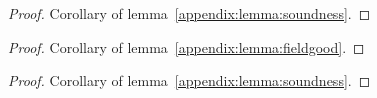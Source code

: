 \begin{lemma} \label{appendix:lemma:fieldgood}

\begin{proof}
  Corollary of lemma~\ref{appendix:lemma:soundness}.
\end{proof}

\end{lemma}

\begin{theorem} \label{appendix:theorem:fieldnil}

\begin{proof}
  Corollary of lemma~\ref{appendix:lemma:fieldgood}.
\end{proof}

\end{theorem}

\begin{theorem} \label{appendix:theorem:methodnil}

\begin{proof}
  Corollary of lemma~\ref{appendix:lemma:soundness}.
\end{proof}

\end{theorem}

{}
